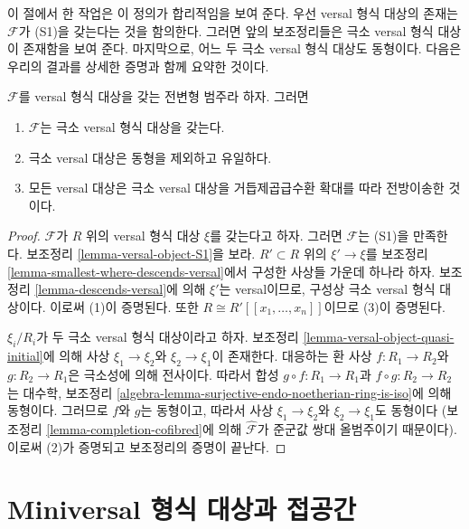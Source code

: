 \noindent
이 절에서 한 작업은 이 정의가 합리적임을 보여 준다.
우선 versal 형식 대상의 존재는 $\mathcal{F}$가 (S1)을 갖는다는
것을 함의한다. 그러면 앞의 보조정리들은 극소 versal 형식 대상이
존재함을 보여 준다. 마지막으로, 어느 두 극소 versal 형식 대상도
동형이다. 다음은 우리의 결과를 상세한 증명과 함께 요약한 것이다.

\begin{lemma}
\label{lemma-minimal-versal}
$\mathcal{F}$를 versal 형식 대상을 갖는 전변형 범주라 하자.
그러면
\begin{enumerate}
\item $\mathcal{F}$는 극소 versal 형식 대상을 갖는다.
\item 극소 versal 대상은 동형을 제외하고 유일하다.
\item 모든 versal 대상은 극소 versal 대상을 거듭제곱급수환
확대를 따라 전방이송한 것이다.
\end{enumerate}
\end{lemma}

\begin{proof}
$\mathcal{F}$가 $R$ 위의 versal 형식 대상 $\xi$를 갖는다고 하자.
그러면 $\mathcal{F}$는 (S1)을 만족한다. 보조정리
\ref{lemma-versal-object-S1}을 보라.
$R' \subset R$ 위의 $\xi' \to \xi$를 보조정리
\ref{lemma-smallest-where-descends-versal}에서 구성한 사상들
가운데 하나라 하자. 보조정리 \ref{lemma-descends-versal}에 의해
$\xi'$는 versal이므로, 구성상 극소 versal 형식 대상이다.
이로써 (1)이 증명된다. 또한
$R \cong R'[[x_1, \ldots, x_n]]$이므로 (3)이 증명된다.

\medskip\noindent
$\xi_i/R_i$가 두 극소 versal 형식 대상이라고 하자.
보조정리 \ref{lemma-versal-object-quasi-initial}에 의해 사상
$\xi_1 \to \xi_2$와 $\xi_2 \to \xi_1$이 존재한다.
대응하는 환 사상 $f : R_1 \to R_2$와 $g : R_2 \to R_1$은
극소성에 의해 전사이다. 따라서 합성
$g \circ f : R_1 \to R_1$과 $f \circ g : R_2 \to R_2$는
대수학, 보조정리
\ref{algebra-lemma-surjective-endo-noetherian-ring-is-iso}에 의해
동형이다. 그러므로 $f$와 $g$는 동형이고, 따라서 사상
$\xi_1 \to \xi_2$와 $\xi_2 \to \xi_1$도 동형이다
(보조정리 \ref{lemma-completion-cofibred}에 의해
$\widehat{\mathcal{F}}$가 준군값 쌍대 올범주이기 때문이다).
이로써 (2)가 증명되고 보조정리의 증명이 끝난다.
\end{proof}

\section{Miniversal 형식 대상과 접공간}
\label{section-miniversal-objects-existence}

